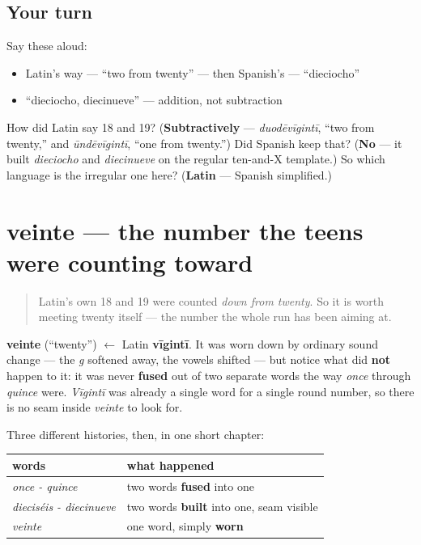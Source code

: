 \subsection*{Your turn}
Say these aloud:

\begin{itemize}
\raggedright
  \item Latin's way — \textquotedblleft{}two from twenty\textquotedblright{} — then Spanish's — \textquotedblleft{}dieciocho\textquotedblright{}
  \item \textquotedblleft{}dieciocho, diecinueve\textquotedblright{} — addition, not subtraction
\end{itemize}

\begin{tcolorbox}[breakable,colback=teal!4,colframe=teal!35!black,title={Before you move on}]
How did Latin say 18 and 19? (\textbf{Subtractively} — \emph{duodēvīgintī}, \textquotedblleft{}two from twenty,\textquotedblright{} and \emph{ūndēvīgintī}, \textquotedblleft{}one from twenty.\textquotedblright{}) Did Spanish keep that? (\textbf{No} — it built \emph{dieciocho} and \emph{diecinueve} on the regular ten-and-X template.) So which language is the irregular one here? (\textbf{Latin} — Spanish simplified.)
\end{tcolorbox}
\section[veinte]{veinte — the number the teens were counting toward}

\label{lesson:ES-C31-veinte}



\begin{quote}
Latin's own 18 and 19 were counted \emph{down from twenty}. So it is worth meeting twenty itself — the number the whole run has been aiming at.
\end{quote}

\begin{cousinweb}
\textbf{veinte} (\textquotedblleft{}twenty\textquotedblright{}) $\leftarrow$ Latin \textbf{vīgintī}. It was worn down by ordinary sound change — the \emph{g} softened away, the vowels shifted — but notice what did \textbf{not} happen to it: it was never \textbf{fused} out of two separate words the way \emph{once} through \emph{quince} were. \emph{Vīgintī} was already a single word for a single round number, so there is no seam inside \emph{veinte} to look for.

Three different histories, then, in one short chapter:

\noindent
\begin{tabularx}{\linewidth}{@{}>{\raggedright\arraybackslash}X>{\raggedright\arraybackslash}X@{}}
\toprule
\textbf{words} & \textbf{what happened} \\
\midrule
\emph{once - quince} & two words \textbf{fused} into one \\
\emph{dieciséis - diecinueve} & two words \textbf{built} into one, seam visible \\
\emph{veinte} & one word, simply \textbf{worn} \\
\bottomrule
\end{tabularx}
\end{cousinweb}

